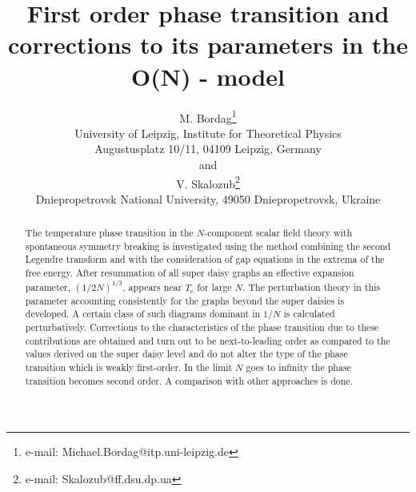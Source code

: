 \documentclass[a4paper,12pt]{article}
\begin{document}
\title{First order phase transition  and corrections to
  its parameters in the O(N) - model}
\author{
{\sc M. Bordag}\thanks{e-mail: Michael.Bordag@itp.uni-leipzig.de} \\
\small  University of Leipzig, Institute for Theoretical Physics\\
\small  Augustusplatz 10/11, 04109 Leipzig, Germany\\
\small and\\
{\sc V. Skalozub}\thanks{e-mail: Skalozub@ff.dsu.dp.ua}\\
\small  Dniepropetrovsk National University, 49050 Dniepropetrovsk, Ukraine}
\maketitle
\begin{abstract}
The temperature phase transition in the $N$-component scalar field
theory with spontaneous symmetry breaking is investigated using the
method combining the second Legendre transform and with the
consideration of gap equations in the extrema of the free
energy. After resummation of all super daisy graphs an effective
expansion parameter, $(1/2N)^{1/3}$, appears near $T_c$ for large $N$.
The perturbation theory in this parameter accounting consistently for
the graphs beyond the super daisies is developed.  A certain class of
such diagrams dominant in $1/N$ is calculated
perturbatively. Corrections to the characteristics of the phase
transition due to these contributions are obtained and turn out to be
next-to-leading order as compared to the values derived on the super
daisy level and do not alter the type of the phase transition which is
weakly first-order.  In the limit $N$ goes to infinity the phase
transition becomes second order.  A comparison with other approaches
is done.
\end{abstract}
\end{document}
